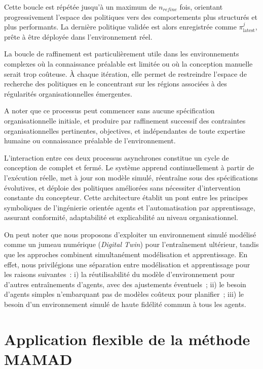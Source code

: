 Cette boucle est répétée jusqu'à un maximum de $n_{refine}$ fois, orientant progressivement l'espace des politiques vers des comportements plus structurés et plus performants. La dernière politique validée est alors enregistrée comme $\pi^j_{\text{latest}}$, prête à être déployée dans l'environnement réel.

La boucle de raffinement est particulièrement utile dans les environnements complexes où la connaissance préalable est limitée ou où la conception manuelle serait trop coûteuse. À chaque itération, elle permet de restreindre l'espace de recherche des politiques en le concentrant sur les régions associées à des régularités organisationnelles émergentes.

A noter que ce processus peut commencer sans aucune spécification organisationnelle initiale, et produire par raffinement successif des contraintes organisationnelles pertinentes, objectives, et indépendantes de toute expertise humaine ou connaissance préalable de l'environnement.

\noindent L'interaction entre ces deux processus asynchrones constitue un cycle de conception de  complet et fermé. Le système apprend continuellement à partir de l'exécution réelle, met à jour son modèle simulé, réentraîne sous des spécifications évolutives, et déploie des politiques améliorées sans nécessiter d'intervention constante du concepteur. Cette architecture établit un pont entre les principes symboliques de l'ingénierie orientée agents et l'automatisation par apprentissage, assurant conformité, adaptabilité et explicabilité au niveau organisationnel.

\noindent On peut noter que nous proposons d'exploiter un environnement simulé modélisé comme un jumeau numérique (\textit{Digital Twin}) pour l'entraînement ultérieur, tandis que les approches  combinent simultanément modélisation et apprentissage. En effet, nous privilégions une séparation entre modélisation et apprentissage pour les raisons suivantes~: i) la réutilisabilité du modèle d'environnement pour d'autres entraînements d'agents, avec des ajustements éventuels~; \quad ii) le besoin d'agents simples n'embarquant pas de modèles coûteux pour planifier~; \quad iii) le besoin d'un environnement simulé de haute fidélité commun à tous les agents.

\section{Application flexible de la méthode MAMAD}
\label{subsec:mamad_flexible}

